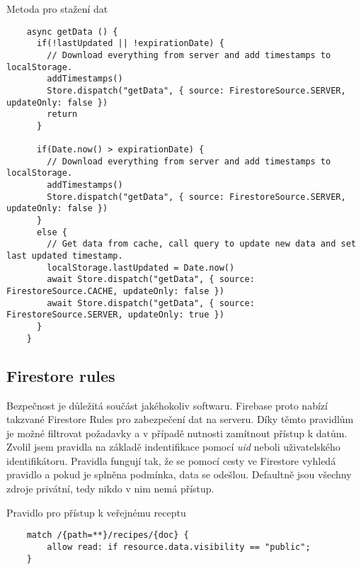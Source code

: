 \begin{listing}[h]
    \caption{Metoda pro stažení dat}
    \begin{verbatim}
    async getData () {
      if(!lastUpdated || !expirationDate) {
        // Download everything from server and add timestamps to localStorage.
        addTimestamps()
        Store.dispatch("getData", { source: FirestoreSource.SERVER, updateOnly: false })
        return
      }

      if(Date.now() > expirationDate) {
        // Download everything from server and add timestamps to localStorage.
        addTimestamps()
        Store.dispatch("getData", { source: FirestoreSource.SERVER, updateOnly: false })
      }
      else {
        // Get data from cache, call query to update new data and set last updated timestamp.
        localStorage.lastUpdated = Date.now()
        await Store.dispatch("getData", { source: FirestoreSource.CACHE, updateOnly: false })
        await Store.dispatch("getData", { source: FirestoreSource.SERVER, updateOnly: true })
      }
    }
    \end{verbatim}
\end{listing}


\subsection{Firestore rules}
Bezpečnost je důležitá součást jakéhokoliv softwaru. Firebase proto nabízí takzvané Firestore Rules pro zabezpečení dat na serveru.
Díky těmto pravidlům je možné filtrovat požadavky a v případě nutnosti zamítnout přístup k datům. Zvolil jsem pravidla na základě
indentifikace pomocí \emph{uid} neboli uživatelského identifikátoru. Pravidla fungují tak, že se pomocí cesty ve Firestore vyhledá
pravidlo a pokud je splněna podmínka, data se odešlou. Defaultně jsou všechny zdroje privátní, tedy nikdo v nim nemá přístup.

\begin{listing}[h]
    \caption{Pravidlo pro přístup k veřejnému receptu}
    \begin{verbatim}
    match /{path=**}/recipes/{doc} {
        allow read: if resource.data.visibility == "public";
    }
    \end{verbatim}
\end{listing}
